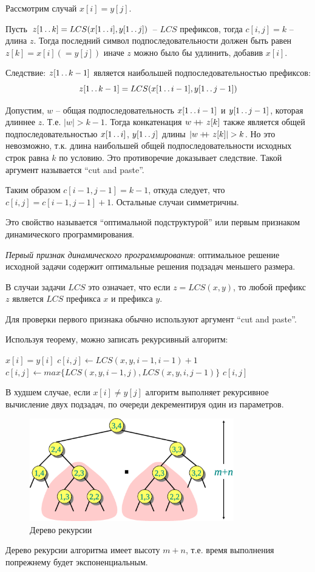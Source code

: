 \documentclass[a4paper,11pt]{article}
\newcommand\doubleplus{+\kern-1.3ex+\kern0.8ex}
\begin{document}
Рассмотрим случай $x[i] = y[j]$.

Пусть $z[1 \mathinner{\ldotp\ldotp} k] = LCS(x[1 \mathinner{\ldotp\ldotp} i], y[1 \mathinner{\ldotp\ldotp} j])$ -- $LCS$
префиксов, тогда $c[i, j] = k$ -- длина $z$. Тогда последний символ
подпоследовательности должен быть равен $z[k] = x[i] (= y[j])$ иначе $z$
можно было бы удлинить, добавив $x[i]$.

Следствие: $z[1 \mathinner{\ldotp\ldotp} k-1]$ является наибольшей подпоследовательностью
префиксов: 
\begin{equation*}
  z[1 \mathinner{\ldotp\ldotp} k-1] = LCS(x[1 \mathinner{\ldotp\ldotp} i-1], y[1 \mathinner{\ldotp\ldotp} j-1])  
\end{equation*}

Допустим, $w$ -- общая подпоследовательность $x[1 \mathinner{\ldotp\ldotp} i-1]$ и
$y[1 \mathinner{\ldotp\ldotp} j-1]$, которая длиннее $z$. Т.е. $|w| > k-1$. Тогда конкатенация
$w \doubleplus z[k]$ также является общей подпоследовательностью 
$x[1 \mathinner{\ldotp\ldotp} i]$, $y[1 \mathinner{\ldotp\ldotp} j]$ длины $|w \doubleplus z[k]| > k$.
Но это невозможно, т.к. длина наибольшей общей подпоследовательности
исходных строк равна $k$ по условию. Это противоречие доказывает следствие.
Такой аргумент называется ``cut and paste''.

Таким образом $c[i-1, j-1] = k-1$, откуда следует, что $c[i, j] = 
c[i-1, j-1] +1$. Остальные случаи симметричны.

Это свойство называется ``оптимальной подструктурой'' или первым признаком
динамического программирования.

\emph{Первый признак динамического программирования}: оптимальное решение
исходной задачи содержит оптимальные решения подзадач меньшего размера.

В случаи задачи $LCS$ это означает, что если $z = LCS(x, y)$, то любой
префикс $z$ является $LCS$ префикса $x$ и префикса $y$.

Для проверки первого признака обычно используют аргумент ``cut and paste''.

Используя теорему, можно записать рекурсивный алгоритм:
\begin{codebox}
\li \If $x[i] = y[i]$
\li   \Then $c[i,j] \gets LCS(x, y, i-1, i-1)+1$
\li   \Else $c[i,j] \gets max\{LCS(x, y, i-1, j), LCS(x, y, i, j-1)\}$
    \End
\li \Return $c[i,j]$
\end{codebox}
В худшем случае, если $x[i] \neq y[j]$ алгоритм выполняет рекурсивное 
вычисление двух подзадач, по очереди декрементируя один из параметров.
\begin{figure}[h!]
  \centering
  \includegraphics[width=3.5in]{lecture8/tree.eps}
  \caption{Дерево рекурсии}
\end{figure}
Дерево рекурсии алгоритма имеет высоту $m+n$, т.е. время выполнения 
попрежнему будет экспоненциальным.
\end{document}
